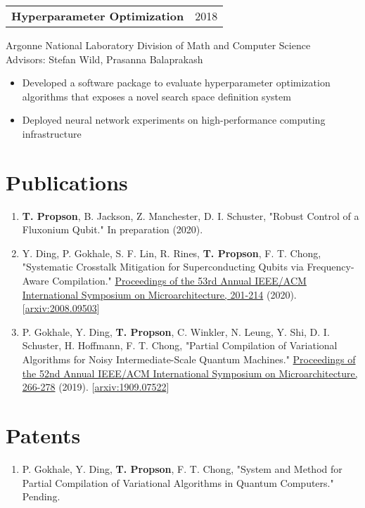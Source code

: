 \documentclass[letterpaper, 11pt]{article}
\begin{document}
\begin{tabular}{@{} L{12cm} @{} R{4.51cm} @{}}
  \textbf{Hyperparameter Optimization} & 2018\\
\end{tabular}
Argonne National Laboratory Division of Math and Computer Science\\
Advisors: Stefan Wild, Prasanna Balaprakash
\begin{itemize}
\item Developed a software package to evaluate hyperparameter optimization algorithms
  that exposes a novel search space definition system
  \item Deployed neural network experiments on high-performance computing infrastructure 
\end{itemize}

\section{Publications}
\begin{enumerate}
\item \textbf{T. Propson}, B. Jackson, Z. Manchester, D. I. Schuster, "Robust Control
  of a Fluxonium Qubit." In preparation (2020).
\item Y. Ding, P. Gokhale, S. F. Lin, R. Rines, \textbf{T. Propson}, F. T. Chong,
  "Systematic Crosstalk Mitigation for Superconducting Qubits via Frequency-Aware Compilation."
  \href{https://ieeexplore.ieee.org/document/9251858}{Proceedings of the 53rd Annual
  IEEE/ACM International Symposium on Microarchitecture, 201-214} (2020).
       [\href{https://arxiv.org/abs/2008.09503}{arxiv:2008.09503}]
\item P. Gokhale, Y. Ding, \textbf{T. Propson}, C. Winkler, N. Leung, Y. Shi,
  D. I. Schuster, H. Hoffmann, F. T. Chong,
  "Partial Compilation of Variational Algorithms for Noisy Intermediate-Scale Quantum Machines."
  \href{https://doi.org/10.1145/3352460.3358313}{Proceedings of the 52nd Annual
    IEEE/ACM International Symposium on Microarchitecture, 266-278} (2019).
       [\href{https://arxiv.org/abs/1909.07522}{arxiv:1909.07522}]
\end{enumerate}

\section{Patents}
\begin{enumerate}
  \item P. Gokhale, Y. Ding, \textbf{T. Propson}, F. T. Chong, "System and Method
    for Partial Compilation of Variational Algorithms in Quantum Computers." Pending.
\end{enumerate}
\end{document}
